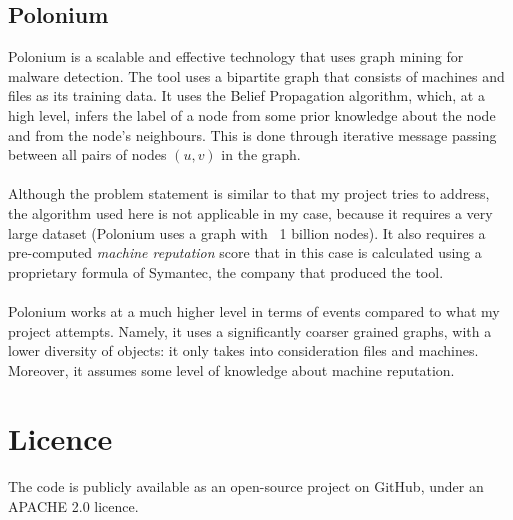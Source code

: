 	\subsection{Polonium}
	Polonium is a scalable and effective technology that uses graph mining for malware detection. The tool uses a bipartite graph that consists of machines and files as its training data. It uses the Belief Propagation algorithm, which, at a high level, infers the label of a node from some prior knowledge about the node and from the node's neighbours. This is done through iterative message passing between all pairs of nodes $(u, v)$ in the graph. 
	\\ \\
	Although the problem statement is similar to that my project tries to address, the algorithm used here is not applicable in my case, because it requires a very large dataset (Polonium uses a graph with ~1 billion nodes). It also requires a pre-computed \textit{machine reputation} score that in this case is calculated using a proprietary formula of Symantec\footnotemark[2], the company that produced the tool. 
	\\ \\
	Polonium works at a much higher level in terms of events compared to what my project attempts. Namely, it uses a significantly coarser grained graphs, with a lower diversity of objects: it only takes into consideration files and machines. Moreover, it assumes some level of knowledge about machine reputation. 

	
	\section{Licence} 
	The code is publicly available as an open-source project on GitHub\footnotemark[3], under an APACHE 2.0 licence\footnotemark[4]. 
	
	
